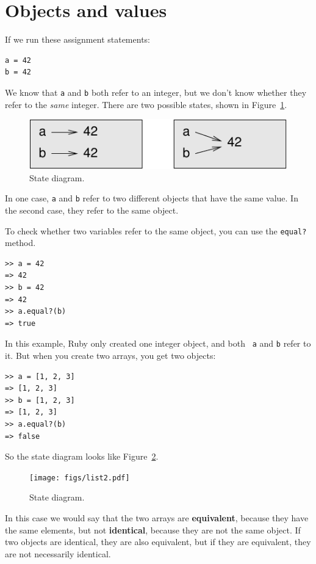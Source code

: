\documentclass[10pt]{book}
\begin{document}
\section{Objects and values}
\label{equivalence}

If we run these assignment statements:

\begin{verbatim}
a = 42
b = 42
\end{verbatim}
%
We know that {\tt a} and {\tt b} both refer to an
integer, but we don't
know whether they refer to the {\em same} integer.
There are two possible states, shown in Figure~\ref{fig.list1}.

\begin{figure}
\centerline
{\includegraphics[scale=0.8]{figs/list1.pdf}}
\caption{State diagram.}
\label{fig.list1}
\end{figure}

In one case, {\tt a} and {\tt b} refer to two different objects that
have the same value.  In the second case, they refer to the same
object.

To check whether two variables refer to the same object, you can
use the {\tt equal?} method.

\begin{verbatim}
>> a = 42
=> 42
>> b = 42
=> 42
>> a.equal?(b)
=> true
\end{verbatim}
%
In this example, Ruby only created one integer object, and both {\tt
  a} and {\tt b} refer to it.  But when you create two arrays, you get
two objects:

\begin{verbatim}
>> a = [1, 2, 3]
=> [1, 2, 3]
>> b = [1, 2, 3]
=> [1, 2, 3]
>> a.equal?(b)
=> false
\end{verbatim}
%
So the state diagram looks like Figure~\ref{fig.list2}.

\begin{figure}
\centerline
{\texttt{[image: figs/list2.pdf]}}
\caption{State diagram.}
\label{fig.list2}
\end{figure}

In this case we would say that the two arrays are {\bf equivalent},
because they have the same elements, but not {\bf identical}, because
they are not the same object.  If two objects are identical, they are
also equivalent, but if they are equivalent, they are not necessarily
identical.
\end{document}
